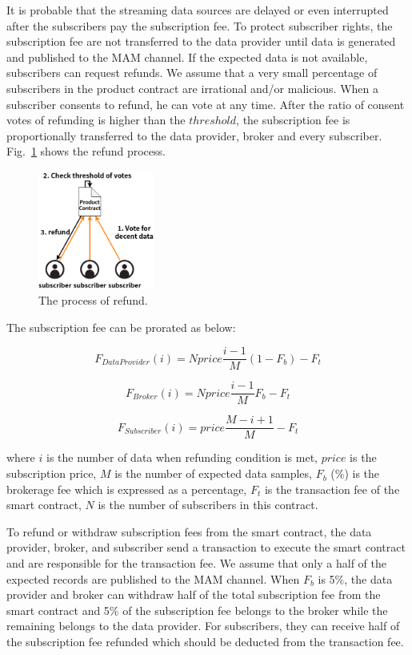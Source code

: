 \documentclass[conference]{IEEEtran}
\begin{document}
It is probable that the streaming data sources are delayed or even interrupted after the subscribers pay the subscription fee. To protect subscriber rights, the subscription fee are not transferred to the data provider until data is generated and published to the MAM channel. If the expected data is not available, subscribers can request refunds. We assume that a very small percentage of subscribers in the product contract are irrational and/or malicious. When a subscriber consents to refund, he can vote at any time. After the ratio of consent votes of refunding is higher than the $threshold$, the subscription fee is proportionally transferred to the data provider, broker and every subscriber. Fig.~\ref{fig:refund} shows the refund process.

\begin{figure}[!t]
	\centering
	\includegraphics[width=1.5in]{refund}
	\caption{The process of refund.}
	\label{fig:refund}
\end{figure}

The subscription fee can be prorated as below:

\begin{equation}
    F_{DataProvider}(i) = N price \frac{i-1}{M} (1-F_{b}) -F_{t}
\end{equation}

\begin{equation}
    F_{Broker}(i) = N price \frac{i-1}{M} F_{b} -F_{t}
\end{equation}

\begin{equation}
    F_{Subscriber}(i) = price \frac{M-i+1}{M} -F_{t}
\end{equation}

where $i$ is the number of data when refunding condition is met, $price$  is the subscription price, $M$ is the number of expected data samples, $F_{b}$ (\%) is the brokerage fee which is expressed as a percentage, $F_{t}$ is the transaction fee of the smart contract, $N$ is the number of subscribers in this contract.

To refund or withdraw subscription fees from the smart contract, the data provider, broker, and subscriber send a transaction to execute the smart contract and are responsible for the transaction fee. We assume that only a half of the expected records are published to the MAM channel. When $F_{b}$ is 5\%, the data provider and broker can withdraw half of the total subscription fee from the smart contract and 5\% of the subscription fee belongs to the broker while the remaining belongs to the data provider. For subscribers, they can receive half of the subscription fee refunded which should be deducted from the transaction fee.
\end{document}

